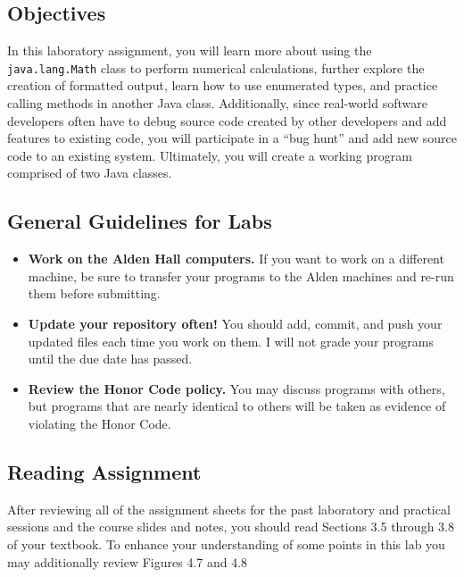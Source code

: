 


\subsection*{Objectives}

In this laboratory assignment, you will learn more about using the {\tt java.lang.Math} class to perform numerical
calculations, further explore the creation of formatted output, learn how to use enumerated types, and practice calling
methods in another Java class.  Additionally, since real-world software developers often have to debug source code
created by other developers and add features to existing code, you will participate in a ``bug hunt'' and add new
source code to an existing system. Ultimately, you will create a working program comprised of two Java classes.

\vspace*{-.1in}
\subsection*{General Guidelines for Labs}

\begin{itemize}
\item
{\bf Work on the Alden Hall computers.} If you want to work on a different
machine, be sure to transfer your programs to the Alden
machines and re-run them before submitting.
\item
{\bf Update your repository often!} You should add, commit,
and push your updated files each time you work on them.  I will not grade
your programs until the due date has passed.
\item
{\bf Review the Honor Code policy.} You
may discuss programs with others, but programs that are nearly identical
to others will be taken as evidence of violating the Honor Code.
\end{itemize}

\vspace*{-.2in}
\subsection*{Reading Assignment}

After reviewing all of the assignment sheets for the past laboratory and practical sessions and the course slides and
notes, you should read Sections 3.5 through 3.8 of your textbook. To enhance your understanding of some points in this
lab you may additionally review Figures 4.7 and 4.8

